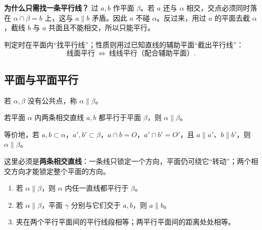 \textbf{为什么只需找一条平行线？} 过 $a,b$ 作平面 $\beta$。若 $a$ 还与 $\alpha$ 相交，交点必须同时落在
$\alpha\cap\beta=b$ 上，这与 $a\parallel b$ 矛盾。因此 $a$ 不碰 $\alpha$。反过来，用过 $a$ 的平面去截
$\alpha$，截线 $b$ 与 $a$ 共面且不能相交，所以只能平行。

\begin{corollarybox}[线面平行与线线平行互化]
  判定时在平面内“找平行线”；性质则用过已知直线的辅助平面“截出平行线”：
  \[
    \text{线面平行}\ \Longleftrightarrow\ \text{线线平行（配合辅助平面）}.
  \]
\end{corollarybox}

\subsection{平面与平面平行}

若 $\alpha,\beta$ 没有公共点，称 $\alpha\parallel\beta$。

\begin{lawbox}[面面平行的判定]
  若平面 $\alpha$ 内两条相交直线 $a,b$ 都平行于平面 $\beta$，则 $\alpha\parallel\beta$。

  等价地，若 $a,b\subset\alpha$，$a',b'\subset\beta$，$a\cap b=O$，$a'\cap b'=O'$，且 $a\parallel a'$、$b\parallel b'$，则 $\alpha\parallel\beta$。
\end{lawbox}

这里必须是\textbf{两条相交直线}：一条线只锁定一个方向，平面仍可绕它“转动”；两个相交方向才能锁定整个平面的方向。

\begin{lawbox}[面面平行的性质]
  \begin{enumerate}
    \item 若 $\alpha\parallel\beta$，则 $\alpha$ 内任一直线都平行于 $\beta$。
    \item 若 $\alpha\parallel\beta$，平面 $\gamma$ 分别与它们交于 $a,b$，则 $a\parallel b$。
    \item 夹在两个平行平面间的平行线段相等；两平行平面间的距离处处相等。
  \end{enumerate}
\end{lawbox}

